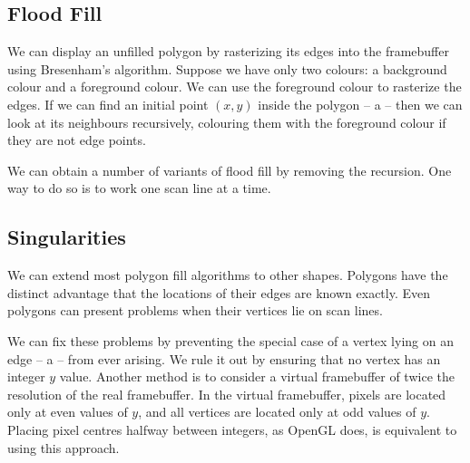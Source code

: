 \documentclass[../COS3712_Notes.tex]{subfiles}
\begin{document}
      \subsection{Flood Fill}
        We can display an unfilled polygon by rasterizing its edges into the framebuffer
        using Bresenham's algorithm.
        Suppose we have only two colours: a background colour and a foreground colour.
        We can use the foreground colour to rasterize the edges.
        If we can find an initial point $(x, y)$ inside the polygon -- a  --
        then we can look at its neighbours recursively, colouring them with the
        foreground colour if they are not edge points.

        We can obtain a number of variants of flood fill by removing the recursion.
        One way to do so is to work one scan line at a time.

      \subsection{Singularities}
        We can extend most polygon fill algorithms to other shapes.
        Polygons have the distinct advantage that the locations of their edges are known exactly.
        Even polygons can present problems when their vertices lie on scan lines.

        We can fix these problems by preventing the special case of a vertex lying on an edge
        -- a  -- from ever arising.
        We rule it out by ensuring that no vertex has an integer $y$ value.
        Another method is to consider a virtual framebuffer of twice the resolution of the
        real framebuffer.
        In the virtual framebuffer, pixels are located only at even values of $y$,
        and all vertices are located only at odd values of $y$.
        Placing pixel centres halfway between integers, as OpenGL does,
        is equivalent to using this approach.
\end{document}
